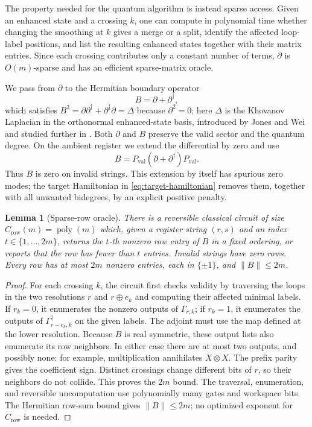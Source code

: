 \documentclass[a4paper,onecolumn,unpublished]{quantumarticle}
\theoremstyle{plain}
\newtheorem{lemma}[theorem]{Lemma}
\theoremstyle{definition}
\theoremstyle{definition}
\numberwithin{equation}{section}
\newcommand{\del}{\partial}
\begin{document}
The property needed for the quantum algorithm is instead sparse access.
Given an enhanced state and a crossing \(k\), one can compute in
polynomial time whether changing the smoothing at \(k\) gives a merge or
a split, identify the affected loop-label positions, and list the
resulting enhanced states together with their matrix entries. Since each
crossing contributes only a constant number of terms, \(\del\) is
\(O(m)\)-sparse and has an efficient sparse-matrix oracle.

We pass from \(\del\) to the Hermitian boundary operator
\[
B=\del+\del^\dagger ,
\]
which satisfies $B^2=\del\del^\dagger+\del^\dagger\del=\Delta$ because $\del^2=0$; here $\Delta$ is the Khovanov Laplacian in the orthonormal enhanced-state basis, introduced by Jones and Wei \cite{JonesWei2025} and studied further in \cite{GrljLaudaSpectralGeometry}.  Both $\del$ and $B$ preserve the valid sector and the quantum degree.  On the ambient register we extend the differential by zero and use
\begin{equation}\label{eq:penalized-B}
B=P_{\mathrm{val}}(\partial+\partial^\dagger)P_{\mathrm{val}}.
\end{equation}
Thus $B$ is zero on invalid strings. This extension by itself has spurious zero modes; the target Hamiltonian in \cref{eq:target-hamiltonian} removes them, together with all unwanted bidegrees, by an explicit positive penalty.

\begin{lemma}[Sparse-row oracle]\label{lem:row-oracle}
There is a reversible classical circuit of size $C_{\mathrm{row}}(m)=\operatorname{poly}(m)$ which, given a register string $(r,s)$ and an index $t\in\{1,\ldots,2m\}$, returns the $t$-th nonzero row entry of $B$ in a fixed ordering, or reports that the row has fewer than $t$ entries. Invalid strings have zero rows. Every row has at most $2m$ nonzero entries, each in $\{\pm1\}$, and $\|B\|\leq2m$.
\end{lemma}

\begin{proof}
For each crossing $k$, the circuit first checks validity by traversing the loops in the two resolutions $r$ and $r\mathbin{\oplus}e_k$ and computing their affected minimal labels. If $r_k=0$, it enumerates the nonzero outputs of $\Gamma_{r,k}$; if $r_k=1$, it enumerates the outputs of $\Gamma_{r-e_k,k}^{\dagger}$ on the given labels. The adjoint must use the map defined at the lower resolution. Because $B$ is real symmetric, these output lists also enumerate its row neighbors. In either case there are at most two outputs, and possibly none: for example, multiplication annihilates $X\otimes X$. The prefix parity gives the coefficient sign. Distinct crossings change different bits of $r$, so their neighbors do not collide. This proves the $2m$ bound. The traversal, enumeration, and reversible uncomputation use polynomially many gates and workspace bits. The Hermitian row-sum bound gives $\|B\|\leq2m$; no optimized exponent for $C_{\mathrm{row}}$ is needed.
\end{proof}
\end{document}
